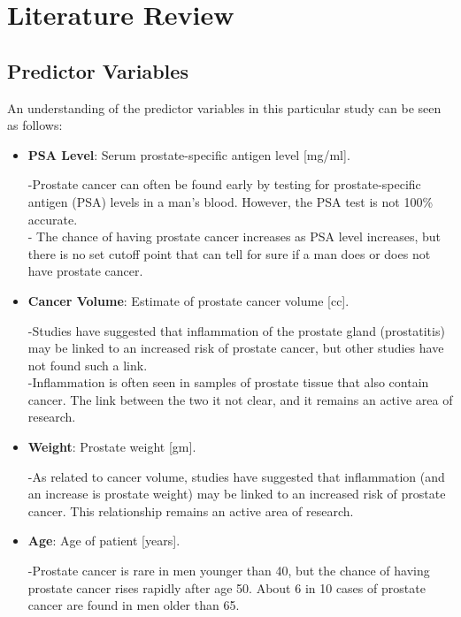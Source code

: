 %
%

\section{Literature Review}

\subsection{Predictor Variables}

\noindent An understanding of the predictor variables in this particular study can be seen as follows:

\begin{itemize}

	\item \textbf{PSA Level}: Serum prostate-specific antigen level [mg/ml]. \par
		-Prostate cancer can often be found early by testing for prostate-specific antigen (PSA) levels in a man's blood. However, the PSA test is not 100\% accurate. \\
		- The chance of having prostate cancer increases as PSA level increases, but there is no set cutoff point that can tell for sure if a man does or does not have prostate cancer.
		
	\item \textbf{Cancer Volume}: Estimate of prostate cancer volume [cc]. \par
		-Studies have suggested that inflammation of the prostate gland (prostatitis) may be linked to an increased risk of prostate cancer, but other studies have not found such a link. \\
		-Inflammation is often seen in samples of prostate tissue that also contain cancer. The link between the two it not clear, and it remains an active area of research. 
		
	\item \textbf{Weight}: Prostate weight [gm]. \par
		-As related to cancer volume, studies have suggested that inflammation (and an increase is prostate weight) may be linked to an increased risk of prostate cancer. This relationship remains an active area of research.
		
	\item \textbf{Age}: Age of patient [years]. \par	
		-Prostate cancer is rare in men younger than 40, but the chance of having prostate cancer rises rapidly after age 50. About 6 in 10 cases of prostate cancer are found in men older than 65.
		

\end{itemize}
